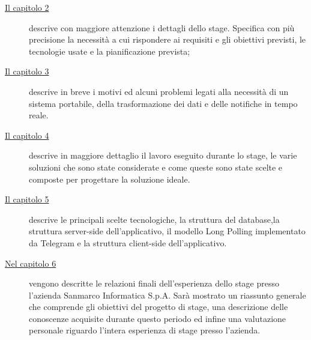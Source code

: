 \begin{description}
    \item[{\hyperref[cap:processi-metodologie]{Il capitolo 2}}] descrive con maggiore attenzione i dettagli dello stage. Specifica con più precisione la necessità a cui rispondere ai requisiti e gli obiettivi previsti, le tecnologie usate e la pianificazione prevista;
    
    \item[{\hyperref[cap:definizione-problema]{Il capitolo 3}}] descrive in breve i motivi ed alcuni problemi legati alla necessità di un sistema portabile, della trasformazione dei dati e delle notifiche in tempo reale.
    
    \item[{\hyperref[cap:analisi-requisiti]{Il capitolo 4}}] descrive in maggiore dettaglio il lavoro eseguito durante lo stage, le varie soluzioni che sono state considerate e come queste sono state scelte e composte per progettare la soluzione ideale.
    
    \item[{\hyperref[cap:progettazione-codifica]{Il capitolo 5}}] descrive le principali scelte tecnologiche, la struttura del database,la struttura server-side dell'applicativo, il modello Long Polling implementato da Telegram e la struttura client-side dell'applicativo.
    
    \item[{\hyperref[cap:conclusioni]{Nel capitolo 6}}] vengono descritte le relazioni finali dell'esperienza dello stage presso l'azienda Sanmarco Informatica S.p.A. Sarà mostrato un riassunto generale che comprende gli obiettivi del progetto di stage, una descrizione delle conoscenze acquisite durante questo periodo ed infine una valutazione personale riguardo l'intera esperienza di stage presso l'azienda. 
\end{description}

